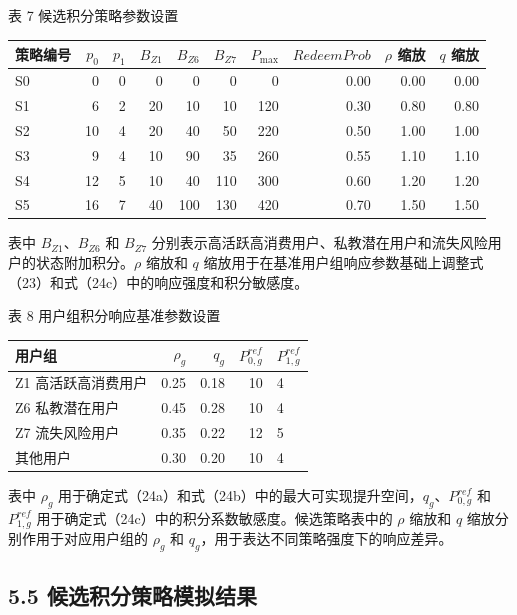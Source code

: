 \documentclass[
  12pt,
]{ctexart}
\begin{document}
\begin{center}\small 表 7 候选积分策略参数设置\end{center}

\begingroup
\small
\setlength{\tabcolsep}{3pt}
\begin{longtable}[]{@{}lrrrrrrrrr@{}}
\toprule
策略编号 & \(p_0\) & \(p_1\) & \(B_{Z1}\) & \(B_{Z6}\) & \(B_{Z7}\) & \(P_{\max}\) & \(RedeemProb\) & \(\rho\) 缩放 & \(q\) 缩放 \\
\midrule
\endhead
S0 & 0 & 0 & 0 & 0 & 0 & 0 & 0.00 & 0.00 & 0.00 \\
S1 & 6 & 2 & 20 & 10 & 10 & 120 & 0.30 & 0.80 & 0.80 \\
S2 & 10 & 4 & 20 & 40 & 50 & 220 & 0.50 & 1.00 & 1.00 \\
S3 & 9 & 4 & 10 & 90 & 35 & 260 & 0.55 & 1.10 & 1.10 \\
S4 & 12 & 5 & 10 & 40 & 110 & 300 & 0.60 & 1.20 & 1.20 \\
S5 & 16 & 7 & 40 & 100 & 130 & 420 & 0.70 & 1.50 & 1.50 \\
\bottomrule
\end{longtable}

表中 \(B_{Z1}\)、\(B_{Z6}\) 和 \(B_{Z7}\) 分别表示高活跃高消费用户、私教潜在用户和流失风险用户的状态附加积分。\(\rho\) 缩放和 \(q\) 缩放用于在基准用户组响应参数基础上调整式（23）和式（24c）中的响应强度和积分敏感度。

\begin{center}\small 表 8 用户组积分响应基准参数设置\end{center}

\begin{longtable}[]{@{}lrrrl@{}}
\toprule
用户组 & \(\rho_g\) & \(q_g\) & \(P_{0,g}^{ref}\) & \(P_{1,g}^{ref}\) \\
\midrule
\endhead
Z1 高活跃高消费用户 & 0.25 & 0.18 & 10 & 4 \\
Z6 私教潜在用户 & 0.45 & 0.28 & 10 & 4 \\
Z7 流失风险用户 & 0.35 & 0.22 & 12 & 5 \\
其他用户 & 0.30 & 0.20 & 10 & 4 \\
\bottomrule
\end{longtable}

表中 \(\rho_g\) 用于确定式（24a）和式（24b）中的最大可实现提升空间，\(q_g\)、\(P_{0,g}^{ref}\) 和 \(P_{1,g}^{ref}\) 用于确定式（24c）中的积分系数敏感度。候选策略表中的 \(\rho\) 缩放和 \(q\) 缩放分别作用于对应用户组的 \(\rho_g\) 和 \(q_g\)，用于表达不同策略强度下的响应差异。

\hypertarget{ux5019ux9009ux79efux5206ux7b56ux7565ux6a21ux62dfux7ed3ux679c}{%
\subsection{5.5 候选积分策略模拟结果}\label{ux5019ux9009ux79efux5206ux7b56ux7565ux6a21ux62dfux7ed3ux679c}}
\end{document}
